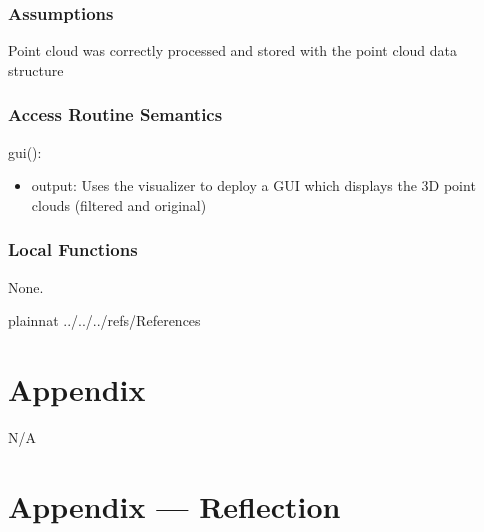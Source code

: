 \documentclass[12pt, titlepage]{article}
\begin{document}
\subsubsection{Assumptions}

Point cloud was correctly processed and stored with the point cloud data structure


\subsubsection{Access Routine Semantics}

\noindent gui():
\begin{itemize}
\item output: Uses the visualizer to deploy a GUI which displays the 3D point clouds (filtered and original)
\end{itemize}

\subsubsection{Local Functions}

None.

\newpage

 {plainnat}
 {../../../refs/References}

\newpage

\section{Appendix} \label{Appendix}

N/A

\newpage{}

\section*{Appendix --- Reflection}
\end{document}
